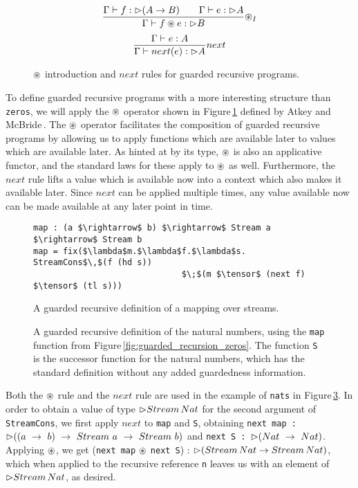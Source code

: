 \begin{figure}
\[
\frac { \Gamma \vdash f: \rhd (A\rightarrow B)\quad \quad \Gamma \vdash e : \rhd A }{ \Gamma \vdash f \circledast e : \rhd B } { \circledast }_{ I }
\]
\[
\frac { \Gamma \vdash e:A }{ \Gamma \vdash next(e):{ \rhd A } } next
\]
\caption{$\circledast$ introduction and $next$ rules for guarded recursive programs.}
\label{fig:guarded_recursion_rules}
\end{figure}
To define guarded recursive programs with a more interesting structure than \texttt{zeros}, we will apply the $\circledast$ operator shown in Figure\,\ref{fig:guarded_recursion_rules} defined by Atkey and McBride\,\citep{Atkey:2013}. The $\circledast$ operator facilitates the composition of guarded recursive programs by allowing us to apply functions which are available later to values which are available later. As hinted at by its type, $\circledast$ is also an applicative functor, and the standard laws for these apply to $\circledast$ as well. Furthermore, the $next$ rule lifts a value which is available now into a context which also makes it available later. Since $next$ can be applied multiple times, any value available now can be made available at any later point in time.

\begin{figure}
\begin{lstlisting}[mathescape]
map : (a $\rightarrow$ b) $\rightarrow$ Stream a $\rightarrow$ Stream b
map = fix($\lambda$m.$\lambda$f.$\lambda$s. StreamCons$\,$(f (hd s)) 
                              $\;$(m $\tensor$ (next f) $\tensor$ (tl s)))
\end{lstlisting}
\caption{A guarded recursive definition of a mapping over streams.}
\label{fig:guarded_recursion_map}
\end{figure}

\begin{figure}

\caption{A guarded recursive definition of the natural numbers, using the \texttt{map} function from Figure\,\ref{fig:guarded_recursion_zeros}. The function \texttt{S} is the successor function for the natural numbers, which has the standard definition without any added guardedness information.}
\label{fig:guarded_recursion_nats}
\end{figure}

Both the $\circledast$ rule and the $next$ rule are used in the example of \texttt{nats} in Figure\,\ref{fig:guarded_recursion_nats}. In order to obtain a value of type $\rhd Stream\,Nat$ for the second argument of \texttt{StreamCons}, we first apply $next$ to \texttt{map} and \texttt{S}, obtaining \texttt{next map :} $\rhd((a~\rightarrow~b)~\rightarrow~Stream~a~\rightarrow~Stream~b)$ and \texttt{next~S~:}~$\rhd(Nat~\rightarrow~Nat)$. Applying $\circledast$, we get (\texttt{next map} $\circledast$ \texttt{next S}) : $\rhd(Stream\,Nat \rightarrow Stream\,Nat)$, which when applied to the recursive reference \texttt{n} leaves us with an element of $\rhd Stream\,Nat$, as desired.

